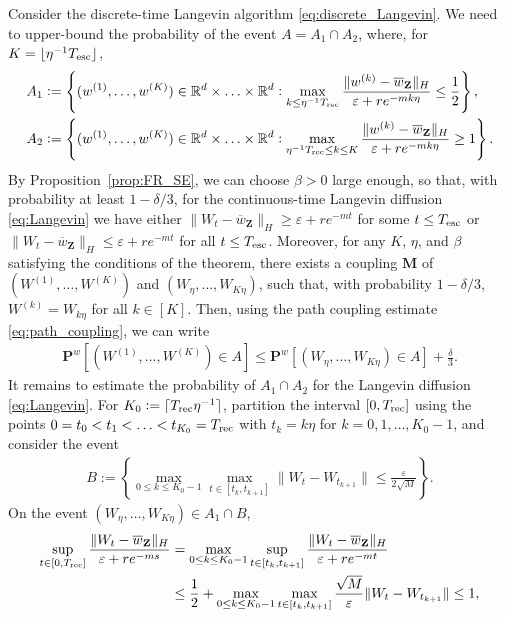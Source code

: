 \documentclass[final,12pt]{colt2018}
\numberwithin{equation}{section}
\numberwithin{equation}{section}
\def\PP{\mathbf{P}}
\def\MM{\mathbf{M}}
\def\Reals{\mathbb{R}}
\def\deq{:=}
\def\bd#1{\mathbf{#1}}
\def\bZ{\bd{Z}}
\def\barw{\overline{w}}
\def\eps{\varepsilon}
\begin{document}
Consider the discrete-time Langevin algorithm \eqref{eq:discrete_Langevin}. We need to upper-bound the probability of the event $A = A_1 \cap A_2$, where, for $K = \lfloor\eta^{-1}T_{\rm esc}\rfloor$,
\begin{align*}
A_1 &\deq \left\{ (w^{(1)},\ldots,w^{(K)}) \in \Reals^d \times \ldots \times \Reals^d : \max_{k \le \eta^{-1}T_{\rm rec}} \frac{\|w^{(k)}-\barw_\bZ\|_H}{\eps + r e^{-mk\eta}}\le \frac{1}{2}\right\}, \\
A_2 &\deq \left\{ (w^{(1)},\ldots,w^{(K)}) \in \Reals^d \times \ldots \times \Reals^d : \max_{\eta^{-1}T_{\rm rec} \le k \le K} \frac{\|w^{(k)}-\barw_\bZ\|_H}{\eps + r e^{-mk\eta}} \ge 1 \right\}.
\end{align*}
By Proposition~\ref{prop:FR_SE}, we can choose $\beta > 0$ large enough, so that, with probability at least $1-\delta/3$, for the continuous-time Langevin diffusion \eqref{eq:Langevin} we have either $\|W_t - \barw_\bZ\|_H \ge \eps + re^{-mt}$ for some $t \le T_{\rm esc}$ or $\|W_t - \barw_\bZ\|_H \le \eps + re^{-mt}$ for all $t  \le T_{\rm esc}$. Moreover, for any $K$, $\eta$, and $\beta$ satisfying the conditions of the theorem, there exists a coupling $\MM$ of $(W^{(1)},\ldots,W^{(K)})$ and $(W_\eta,\ldots,W_{K\eta})$, such that, with probability $1-\delta/3$, $W^{(k)}=W_{k\eta}$ for all $k \in [K]$. Then,
using the path coupling estimate \eqref{eq:path_coupling}, we can write
\begin{align*}
	\PP^w[(W^{(1)},\ldots,W^{(K)}) \in A] \le \PP^w[(W_\eta,\ldots,W_{K\eta}) \in A] + \frac{\delta}{3}.
\end{align*}
It remains to estimate the probability of ${A}_1 \cap {A}_2$ for the Langevin diffusion \eqref{eq:Langevin}. For $K_0 \deq \lceil T_{\rm rec}\eta^{-1}\rceil$, partition the interval $[0,T_{\rm rec}]$ using the points $0 = t_0 < t_1 < \ldots < t_{K_0} = T_{\rm rec}$ with $t_k = k\eta$ for $k = 0,1,\ldots,K_0-1$, and consider the event
\begin{align*}
	B \deq \left\{ \max_{0 \le k \le K_0-1} \max_{t \in [t_k,t_{k+1}]}  \|W_t - W_{t_{k+1}}\| \le \frac{\eps}{2\sqrt{M}}\right\}.
\end{align*}
On the event $(W_\eta,\ldots,W_{K\eta}) \in A_1 \cap B$,
\begin{align*}
	\sup_{t \in [0,T_{\rm rec}]} \frac{\|W_t - \barw_\bZ\|_H}{\eps + re^{-ms}} &= \max_{0 \le k \le K_0-1} \sup_{t \in [t_k,t_{k+1}]} \frac{\|W_t - \barw_\bZ\|_H}{\eps + re^{-mt}} \\
	&\le \frac{1}{2} + \max_{0 \le k \le K_0-1} \max_{t \in [t_k,t_{k+1}]} \frac{\sqrt{M}}{\eps} \|W_t - W_{t_{k+1}}\| \le 1,
\end{align*}
\end{document}
